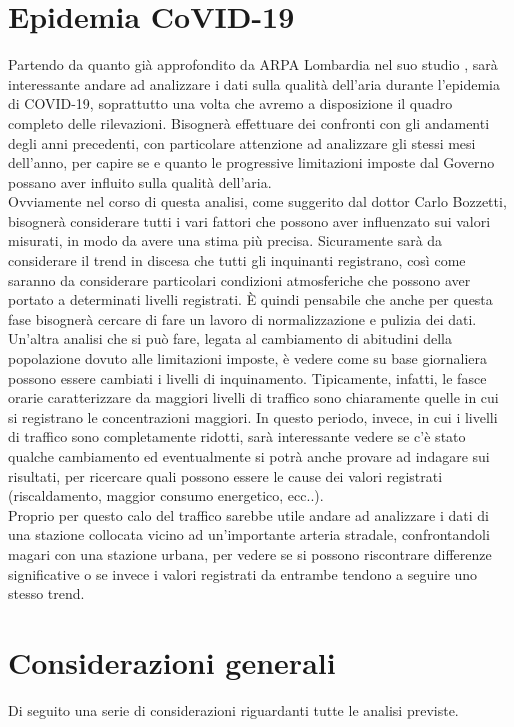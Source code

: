 \documentclass{article}
\begin{document}
\section{Epidemia CoVID-19}
Partendo da quanto già approfondito da ARPA Lombardia nel suo studio \cite{arpaCovid}, sarà interessante andare ad analizzare i dati sulla qualità dell'aria durante l'epidemia di COVID-19, soprattutto una volta che avremo a disposizione il quadro completo delle rilevazioni. Bisognerà effettuare dei confronti con gli andamenti degli anni precedenti, con particolare attenzione ad analizzare gli stessi mesi dell'anno, per capire se e quanto le progressive limitazioni imposte dal Governo possano aver influito sulla qualità dell'aria.
\\Ovviamente nel corso di questa analisi, come suggerito dal dottor Carlo Bozzetti, bisognerà considerare tutti i vari fattori che possono aver influenzato sui valori misurati, in modo da avere una stima più precisa. Sicuramente sarà da considerare il trend in discesa che tutti gli inquinanti registrano, così come saranno da considerare particolari condizioni atmosferiche che possono aver portato a determinati livelli registrati. È quindi pensabile che anche per questa fase bisognerà cercare di fare un lavoro di normalizzazione e pulizia dei dati.
\\Un'altra analisi che si può fare, legata al cambiamento di abitudini della popolazione dovuto alle limitazioni imposte, è vedere come su base giornaliera possono essere cambiati i livelli di inquinamento. Tipicamente, infatti, le fasce orarie caratterizzare da maggiori livelli di traffico sono chiaramente quelle in cui si registrano le concentrazioni maggiori. In questo periodo, invece, in cui i livelli di traffico sono completamente ridotti, sarà interessante vedere se c'è stato qualche cambiamento ed eventualmente si potrà anche provare ad indagare sui risultati, per ricercare quali possono essere le cause dei valori registrati (riscaldamento, maggior consumo energetico, ecc..).
\\Proprio per questo calo del traffico sarebbe utile andare ad analizzare i dati di una stazione collocata vicino ad un'importante arteria stradale, confrontandoli magari con una stazione urbana, per vedere se si possono riscontrare differenze significative o se invece i valori registrati da entrambe tendono a seguire uno stesso trend.
\newpage

\section{Considerazioni generali}
Di seguito una serie di considerazioni riguardanti tutte le analisi previste.
\end{document}
